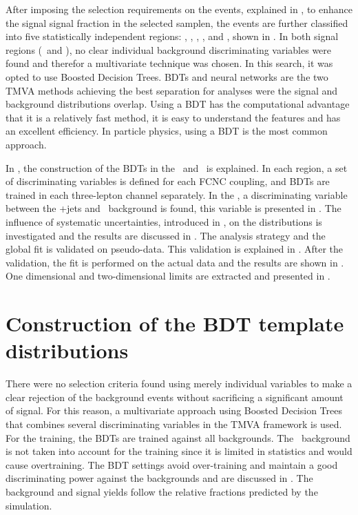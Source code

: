 After imposing the selection requirements on the events, explained in , to enhance the signal signal fraction in the selected samplen, the events are further classified into five statistically independent regions: \STSR, \TTSR, \WZCR, \STCR, and \TTCR, shown in . In both signal regions (\STSR\ and \TTSR), no clear individual background discriminating variables were found and therefor a multivariate technique was chosen. In this search, it was opted to use Boosted Decision Trees. BDTs and neural networks are the two TMVA methods achieving the best separation for analyses were the signal and background distributions overlap. Using a BDT has the computational advantage that it is a relatively fast method, it is easy to understand the features and has an excellent efficiency. In particle physics, using a  BDT is the most common approach. 

In , the construction of the BDTs in the \STSR\ and \TTSR\ is explained. In each region, a set of discriminating variables is defined for each FCNC coupling, and BDTs are trained in each three-lepton channel separately. In the \WZCR, a discriminating variable between the \WZ+jets and \NPL\ background is found, this variable is presented in . The influence of systematic uncertainties, introduced in , on the distributions is investigated and the results are discussed in . The analysis strategy and the global fit is validated on pseudo-data. This validation is explained in . After the validation, the fit is performed on the actual data and the results are shown in . One dimensional and two-dimensional limits are extracted and presented in .


\section{Construction of the BDT template distributions}
\label{sec:templates}
There were no selection criteria found using merely individual variables to make a clear rejection of the background events without sacrificing a significant amount of signal. For this reason, a multivariate approach using Boosted Decision Trees that combines several discriminating variables in the TMVA framework is used. For the training, the BDTs are trained against all backgrounds.  The \NPL\ background is not taken into account for the training since it is limited in statistics and would cause overtraining. The BDT settings  avoid over-training and  maintain a good discriminating power against the backgrounds and are discussed in . The background and signal yields follow the relative fractions predicted by the simulation. 

